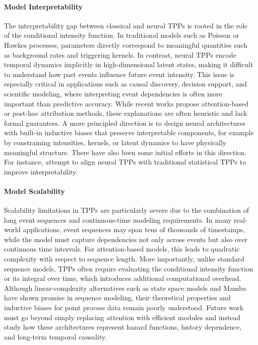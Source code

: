 \documentclass[10pt]{article} %
\begin{document}
\paragraph{Model Interpretability}
The interpretability gap between classical and neural TPPs is rooted in the role of the conditional intensity function. In traditional models such as Poisson or Hawkes processes, parameters directly correspond to meaningful quantities such as background rates and triggering kernels. In contrast, neural TPPs encode temporal dynamics implicitly in high-dimensional latent states, making it difficult to understand how past events influence future event intensity. 
This issue is especially critical in applications such as causal discovery, decision support, and scientific modeling, where interpreting event dependencies is often more important than predictive accuracy. While recent works propose attention-based or post-hoc attribution methods, these explanations are often heuristic and lack formal guarantees. 
A more principled direction is to design neural architectures with built-in inductive biases that preserve interpretable components, for example by constraining intensities, kernels, or latent dynamics to have physically meaningful structure. There have also been some initial efforts in this direction. For instance, \citet{meng2024interpretable,zhou2023automatic} attempt to align neural TPPs with traditional statistical TPPs to improve interpretability.

\paragraph{Model Scalability}
Scalability limitations in TPPs are particularly severe due to the combination of long event sequences and continuous-time modeling requirements. In many real-world applications, event sequences may span tens of thousands of timestamps, while the model must capture dependencies not only across events but also over continuous time intervals. 
For attention-based models, this leads to quadratic complexity with respect to sequence length. More importantly, unlike standard sequence models, TPPs often require evaluating the conditional intensity function or its integral over time, which introduces additional computational overhead. 
Although linear-complexity alternatives such as state space models and Mamba \citep{chang2024deep,gao2024mamba} have shown promise in sequence modeling, their theoretical properties and inductive biases for point process data remain poorly understood. Future work must go beyond simply replacing attention with efficient modules and instead study how these architectures represent hazard functions, history dependence, and long-term temporal causality.
\end{document}
